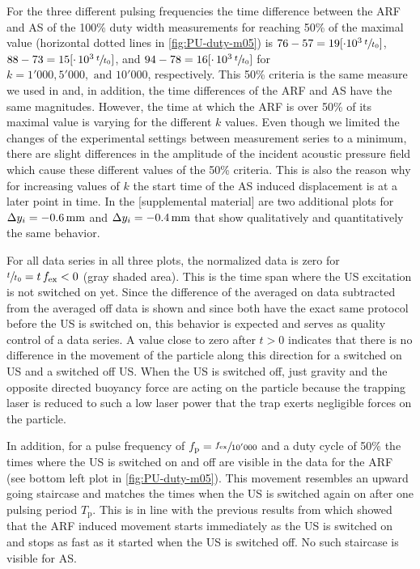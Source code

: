 For the three different pulsing frequencies the time difference between the ARF 
and AS of the 100\% duty width measurements for reaching 50\% of the maximal 
value (horizontal dotted lines in \cref{fig:PU-duty-m05}) is $76-57=19[\cdot 
10^{3}\,\sfrac{t}{t_{0}}]$, $88-73=15[\cdot\,10^{3}\,\sfrac{t}{t_{0}}]$, and 
$94-78=16[\cdot\,10^{3}\,\sfrac{t}{t_{0}}]$ for $k=1'000, 5'000,\text{ and } 
10'000$, respectively. This 50\% criteria is the same measure we used in 
\cite{Goering2021} and, in addition, the time differences of the ARF and AS 
have the same magnitudes. However, the time at which the ARF is over 50\% of 
its maximal value is varying for the different $k$ values. Even though we 
limited the changes of the experimental settings between measurement series to 
a minimum, there are slight differences in the amplitude of the incident 
acoustic pressure field which cause these different values of the 50\% 
criteria. This is also the reason why for increasing values of $k$  the start 
time of the AS induced displacement is at a later point in time. In the 
[supplemental material] are two additional plots for $\Dy_{i} = \SI{-0.6}{\mm}$ 
and $\Dy_{i}= \SI{-0.4}{\mm}$ that show qualitatively and quantitatively the 
same behavior.

For all data series in all three plots, the normalized data is zero for 
$\sfrac{t}{t_{0}}=t\,f_{\mathrm{ex}}<0$ (gray shaded area). This is the time span where 
the US excitation is not switched on yet. Since the difference of the averaged 
on data subtracted from the averaged off data is shown and since both have the 
exact same protocol before the US is switched on, this behavior is expected and 
serves as quality control of a data series. A value close to zero after $t>0$ 
indicates that there is no difference in the movement of the particle along 
this direction for a switched on US and a switched off US. When the US is 
switched off, just gravity and the opposite directed buoyancy force are acting 
on the particle because the trapping laser is reduced to such a low laser power 
that the trap exerts negligible forces on the particle.

In addition, for a pulse frequency of $f_{\mathrm{p}}=\sfrac{f_{\mathrm{ex}}}{10'000}$ and a duty 
cycle of 50\% the times where the US is switched on and off are visible in the 
data for the ARF (see bottom left plot in
\cref{fig:PU-duty-m05}). This movement resembles an upward going staircase and 
matches the times when the US is switched again on after one pulsing period 
$T_{\mathrm{p}}$. This is in line with the previous results from 
\cite{Goering2021} which showed that the ARF induced movement starts 
immediately as the US is switched on and stops as fast as it started when the 
US is switched off. No such staircase is visible for AS.

